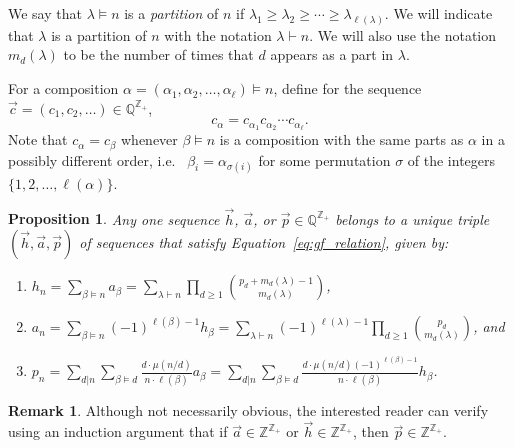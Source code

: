 \documentclass[11pt]{amsart}
\newcommand{\defncolor}{\color{darkred}}
\newcommand{\defn}[1]{{\defncolor\emph{#1}}} %
\newtheorem{proposition}[theorem]{Proposition}
\theoremstyle{definition}
\newtheorem{remark}[theorem]{Remark}
\numberwithin{equation}{section}
\def\ZZ{{\mathbb Z}}
\def\QQ{{\mathbb Q}}
\begin{document}
We say that $\lambda \vDash n$ is a \defn{partition} of $n$ if $\lambda_1 \geq \lambda_2 \geq \cdots \geq \lambda_{\ell(\lambda)}$.  We will indicate that $\lambda$ is a partition
of $n$ with the notation $\lambda \vdash n$.  We will also use the notation $m_d(\lambda)$ to be the number of times
that $d$ appears as a part in $\lambda$.

For a composition $\alpha = (\alpha_{1}, \alpha_{2}, \ldots, \alpha_{\ell}) \vDash n$,
define for the sequence $\vec{c} = (c_{1}, c_{2}, \ldots) \in \QQ^{\ZZ_+}$,
\[
c_{\alpha} = c_{\alpha_{1}} c_{\alpha_{2}} \cdots c_{\alpha_{\ell}}.
\]
Note that $c_{\alpha} = c_{\beta}$ whenever $\beta \vDash n$ is a composition with the same parts as $\alpha$ in a possibly different order, i.e.~ $\beta_{i} = \alpha_{\sigma(i)}$ for some permutation $\sigma$ of the integers $\{1,2, \ldots, \ell(\alpha)\}$.

\begin{proposition}
\label{prop:sequences}
Any one sequence $\vec{h}$, $\vec{a}$, or $\vec{p} \in \QQ^{\ZZ_+}$ belongs to a unique triple $(\vec{h}, \vec{a}, \vec{p})$ of sequences that satisfy Equation~\eqref{eq:gf_relation}, given by:
\begin{enumerate}[label = (\roman*), itemsep = 1em]
\item $\displaystyle h_{n}
= \sum_{\beta \vDash n} a_\beta
= \sum_{\lambda \vdash n} \prod_{d \geq 1} \binom{p_d + m_d(\lambda) -1}{m_d(\lambda)}$, 

\item $\displaystyle a_n
= \sum_{\beta \vDash n} (-1)^{\ell(\beta)-1} h_\beta
= \sum_{\lambda \vdash n} (-1)^{\ell(\lambda)-1} \prod_{d \geq 1} \binom{p_d}{m_d(\lambda)}$, and

\item $\displaystyle p_n
= \sum_{d|n} \sum_{\beta \vDash d} \frac{d\cdot \mu(n/d)}{n \cdot \ell(\beta)} a_\beta
= \sum_{d|n} \sum_{\beta \vDash d} \frac{d\cdot \mu(n/d) (-1)^{\ell(\beta)-1}}{n \cdot \ell(\beta)} h_\beta$.

\end{enumerate}
\end{proposition}

\begin{remark} Although not necessarily obvious, the interested reader can verify using an induction argument that if $\vec{a} \in \ZZ^{\ZZ_+}$ or $\vec{h} \in \ZZ^{\ZZ_+}$, then $\vec{p} \in \ZZ^{\ZZ_+}$.
\end{remark}
\end{document}
